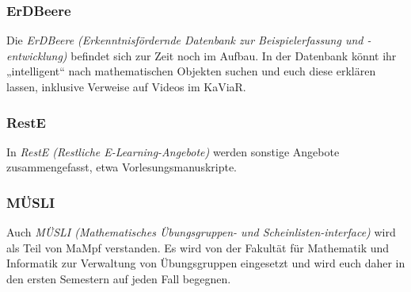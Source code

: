 \subsubsection{ErDBeere}
Die \emph{ErDBeere (Erkenntnisfördernde Datenbank zur Beispielerfassung und -entwicklung)} befindet sich zur Zeit noch im Aufbau. In der Datenbank könnt ihr „intelligent“ nach mathematischen Objekten suchen und euch diese erklären lassen, inklusive Verweise auf Videos im KaViaR.

\subsubsection{RestE}
In \emph{RestE (Restliche E-Learning-Angebote)} werden sonstige Angebote zusammengefasst, etwa Vorlesungsmanuskripte.

\subsubsection{MÜSLI}
Auch \emph{MÜSLI (Mathematisches Übungsgruppen- und Scheinlisten-interface)} wird als Teil von MaMpf verstanden. Es wird von der Fakultät für Mathematik und Informatik zur Verwaltung von Übungsgruppen eingesetzt und wird euch daher in den ersten Semestern auf jeden Fall begegnen.
